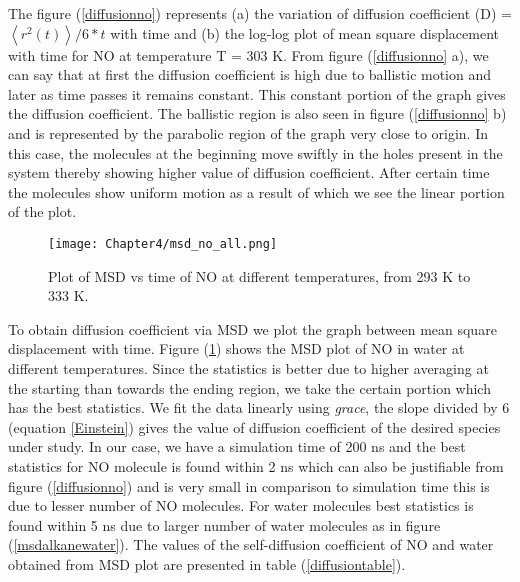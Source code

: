   The figure (\ref{diffusionno}) represents  (a) the  variation of diffusion coefficient (D) = $\left\langle r^2(t)\right\rangle / 6*t$  with  time and (b) the log-log plot of mean square displacement with time  for NO at temperature T = 303 K. From figure (\ref{diffusionno} a), we can say that at first the diffusion coefficient is high due to ballistic motion and later as time passes it remains constant. This constant portion of the graph gives the diffusion coefficient. The ballistic region is also  seen in figure (\ref{diffusionno} b) and is represented by the parabolic region of
 the graph very close to origin. In this case, the molecules at the beginning move swiftly in the holes present in the system thereby  showing higher value of diffusion coefficient. After certain time the molecules show uniform motion as a result of which we see the linear portion of the plot.
 
\begin{figure}[h!]
 \centering
\texttt{[image: Chapter4/msd\_no\_all.png]}
\caption[Plot of MSD vs time of NO at different temperatures. ]{Plot of MSD vs time of NO at different temperatures, from 293 K to 333 K.}
\label{msdno}
\end{figure}

 To obtain diffusion coefficient via MSD we plot the graph between mean square displacement with time. Figure (\ref{msdno}) shows the MSD plot of NO in water at different temperatures. Since the statistics is better due to higher averaging at the starting than towards the ending region, we take the certain portion which has the best statistics. We  fit the data linearly using \emph{grace}, the slope divided by 6 (equation \ref{Einstein}) gives the value of diffusion coefficient of the desired species under study. In our case, we have a simulation time of 200 ns and the best statistics for NO molecule is found within 2 ns which can also be justifiable from figure (\ref{diffusionno}) and is very small in comparison to simulation time this is due to lesser number of NO molecules. For water molecules best statistics is found within 5 ns due to larger number of water molecules as in figure (\ref{msdalkanewater}). The values of the self-diffusion coefficient of NO and water obtained from MSD plot are presented in table (\ref{diffusiontable}).

